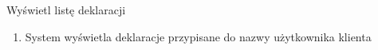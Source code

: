 	\begin{usecase}{Wyświetl listę deklaracji}
		\author{Beata Obrok}
		\maketitle
		\begin{scenario}
			\begin{enumerate}
				\item System wyświetla deklaracje przypisane do nazwy użytkownika klienta
			\end{enumerate}
		\end{scenario}
	\end{usecase}

